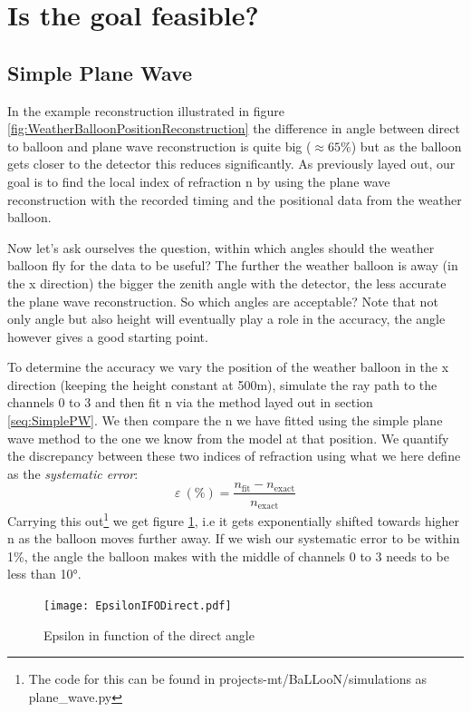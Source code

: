 \section{Is the goal feasible?}
\subsection{Simple Plane Wave}
In the example reconstruction illustrated in figure
\ref{fig:WeatherBalloonPositionReconstruction} the difference in angle between
direct to balloon and plane wave reconstruction is quite big
($\approx 65\%$) but as the balloon gets closer to the detector this reduces
significantly. As previously layed out, our goal is to find the local index of refraction n by using the
plane wave reconstruction with the recorded timing and the positional data from
the weather balloon.

Now let's ask ourselves the question, within which angles should the
weather balloon fly for the data to be useful?  The
further the weather balloon is away (in the x direction) the bigger the zenith
angle with the detector, the less accurate the plane wave reconstruction.  So
which angles are acceptable? Note that not only angle but also height will eventually
play a role in the accuracy, the angle however gives a good starting point.

To determine the accuracy we vary the position of the weather balloon in the x direction (keeping the
height constant at 500m), simulate the ray path to the channels 0 to 3 and then fit n
via the method layed out in section \ref{seq:SimplePW}.
We then compare the n we have fitted using the simple plane wave method to the
one we know from the model at that position.  We quantify the discrepancy
between these two indices of refraction using what we here define as the
\textit{systematic error}:
\begin{equation}
  \varepsilon\ (\%) = \frac{n_\text{fit} - n_{\text{exact}}}{n_{\text{exact}}}
\end{equation}
Carrying this out\footnote{The code for this can be found in
projects-mt/BaLLooN/simulations as plane\_wave.py} we get figure
\ref{fig:EpsilonIFODirect}, i.e it gets exponentially shifted towards higher n
as the balloon moves further away. If we wish our systematic error to be
within 1\%, the angle the balloon makes with the middle of channels 0 to 3
needs to be less than 10°.
\begin{figure}
	\centering
	\texttt{[image: EpsilonIFODirect.pdf]}
	\caption{Epsilon in function of the direct angle}
	\label{fig:EpsilonIFODirect}
\end{figure}

